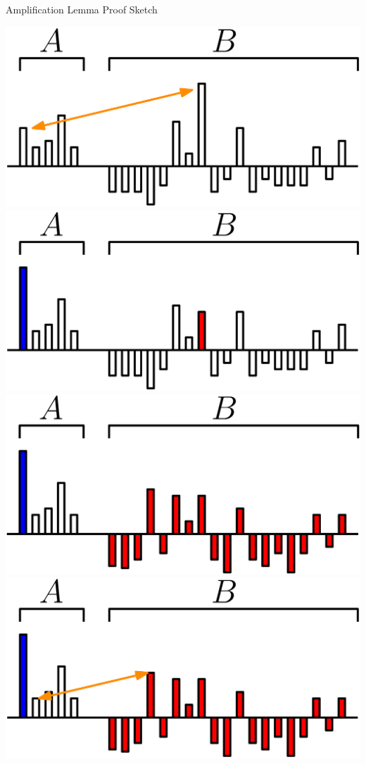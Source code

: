 \documentclass[xcolor=x11names, svgnames, rgb]{beamer}
\begin{document}
\begin{frame}[t]{Amplification Lemma Proof Sketch}
\begin{overprint}
     \includegraphics[width=\linewidth]{amppf/ani2.eps}
     \includegraphics[width=\linewidth]{amppf/ani3.eps}
     \includegraphics[width=\linewidth]{amppf/ani4.eps}
     \includegraphics[width=\linewidth]{amppf/ani5.eps}

\end{overprint}
\end{frame}
\end{document}
